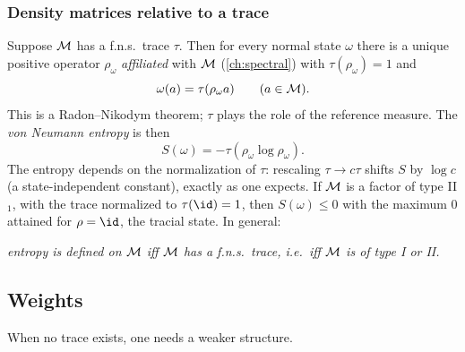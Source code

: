 \subsubsection{Density matrices relative to a trace}
Suppose $\mathcal{M}$ has a f.n.s.\ trace $\tau$. Then for every normal state $\omega$ there is a unique positive operator $\rho_\omega$ \emph{affiliated} with $\mathcal{M}$ (\cref{ch:spectral}) with $\tau(\rho_\omega)=1$ and
\begin{equation}
\omega(a)=\tau(\rho_\omega a)\qquad(a\in\mathcal{M}).
\end{equation}
This is a Radon--Nikodym theorem; $\tau$ plays the role of the reference measure. The \emph{von Neumann entropy} is then
\begin{equation}
S(\omega)=-\tau(\rho_\omega\log\rho_\omega).
\end{equation}
The entropy depends on the normalization of $\tau$: rescaling $\tau\to c\tau$ shifts $S$ by $\log c$ (a state-independent constant), exactly as one expects. If $\mathcal{M}$ is a factor of type II$_1$, with the trace normalized to $\tau(\id)=1$, then $S(\omega)\le0$ with the maximum $0$ attained for $\rho=\id$, the tracial state. In general:
\begin{center}
\emph{entropy is defined on $\mathcal{M}$ iff $\mathcal{M}$ has a f.n.s.\ trace, i.e.\ iff $\mathcal{M}$ is of type I or II.}
\end{center}

\subsection{Weights}

When no trace exists, one needs a weaker structure.

